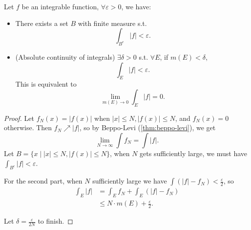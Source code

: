 \begin{proposition}
    Let $f$ be an integrable function, $\forall\varepsilon>0$, we have:
	 \begin{itemize}
		\item There exists a set $B$ with finite measure s.t.
			\[
				\int_{B^c}|f|<\varepsilon
			.\]
	    \item (Absolute continuity of integrals) $\exists\delta>0$ s.t.
			$\forall E$, if $m(E)<\delta$,
			 \[
			 \int_E |f| < \varepsilon
			.\]
			This is equivalent to
			\[
				\lim_{m(E)\to 0}\int_E |f| = 0
			.\]
	\end{itemize}
\end{proposition}
\begin{proof}[Proof]
    Let $f_N(x) = |f(x)|$ when $|x|\le N, |f(x)|\le N$, and $f_N(x)=0$ otherwise. 
	Then $f_N \nearrow |f|$, so by Beppo-Levi (\autoref{thm:beppo-levi}),
	we get
	\[
		\lim_{N\to \infty}\int f_N = \int |f|.
	\]
	Let $B = \{x\mid |x|\le N, |f(x)|\le N\}$, when $N$ gets sufficiently large,
	we must have $\int_{B^c}|f|<\varepsilon$.

	For the second part, when $N$ sufficiently large we have
	$\int (|f|-f_N)<\frac{\varepsilon}{2}$, so
	\begin{align*}
		\int_{E}|f| &= \int_E f_N + \int_E(|f|-f_N)\\
		&\le N\cdot m(E) + \frac{\varepsilon}{2}.
	\end{align*}
	
	Let $\delta = \frac{\varepsilon}{2N}$ to finish.
\end{proof}
